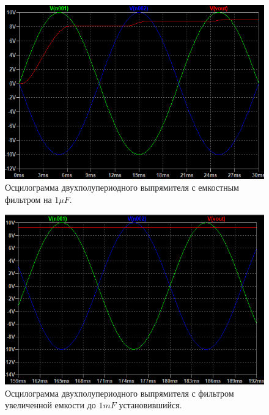 \begin{figure}[htbp]
    \centering
    \includegraphics[width=0.8\linewidth]{figs/осц_двухпол_выпр_фильтр_увел_емк.png}
    \caption{Осцилограмма двухполупериодного выпрямителя с емкостным фильтром на $1\mu F$.}
    \label{fig:осцдвухполупериодноговыпрямителясфильтрувелемк}
\end{figure}

\begin{figure}[htbp]
    \centering
    \includegraphics[width=0.8\linewidth]{figs/осц_двухпол_вып_фильтр_увл_емк_после_100.png}
    \caption{Осцилограмма двухполупериодного выпрямителя с фильтром увеличенной емкости до $1mF$ установившийся.}
    \label{fig:осцдвухполупериодноговыпрямителясфильтрувелемк100}
\end{figure}

